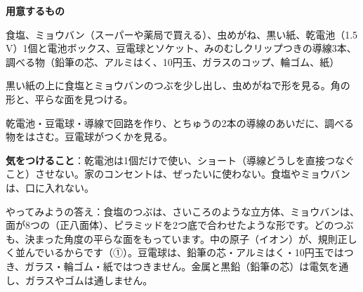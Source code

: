 \begin{yattemiyou}
\textbf{用意するもの}\par
食塩、ミョウバン（スーパーや薬局で買える）、虫めがね、黒い紙、乾電池（1.5 V）1個と電池ボックス、豆電球とソケット、みのむしクリップつきの導線3本、調べる物（鉛筆の芯、アルミはく、10円玉、ガラスのコップ、輪ゴム、紙）\par\vspace{2pt}
\begin{enumerate}[label={\bkcircled[bkGreen]{\arabic*}}, leftmargin=2.4\zw, itemsep=1pt, topsep=0pt]
\item 黒い紙の上に食塩とミョウバンのつぶを少し出し、虫めがねで形を見る。角の形と、平らな面を見つける。
\item 乾電池・豆電球・導線で回路を作り、とちゅうの2本の導線のあいだに、調べる物をはさむ。豆電球がつくかを見る。
\end{enumerate}
\par\vspace{2pt}\textbf{気をつけること}：乾電池は1個だけで使い、ショート（導線どうしを直接つなぐこと）させない。家のコンセントは、ぜったいに使わない。食塩やミョウバンは、口に入れない。
\end{yattemiyou}

\noindent やってみようの答え：食塩のつぶは、さいころのような立方体、ミョウバンは、面が8つの（正八面体）、ピラミッドを2つ底で合わせたような形です。どのつぶも、決まった角度の平らな面をもっています。中の原子（イオン）が、規則正しく並んでいるからです（①）。豆電球は、鉛筆の芯・アルミはく・10円玉ではつき、ガラス・輪ゴム・紙ではつきません。金属と黒鉛（鉛筆の芯）は電気を通し、ガラスやゴムは通しません。

\begin{omoidasou}
\end{omoidasou}

